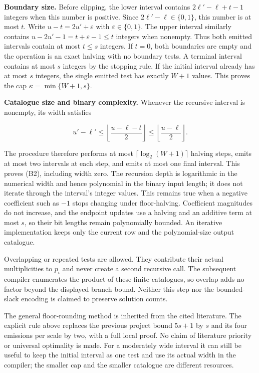 \textbf{Boundary size.} Before clipping, the lower interval contains \(2\ell'-\ell+t-1\) integers when this number is positive. Since \(2\ell'-\ell\in\{0,1\}\), this number is at most \(t\). Write \(u-t=2u'+\varepsilon\) with \(\varepsilon\in\{0,1\}\). The upper interval similarly contains \(u-2u'-1=t+\varepsilon-1\le t\) integers when nonempty. Thus both emitted intervals contain at most \(t\le s\) integers. If \(t=0\), both boundaries are empty and the operation is an exact halving with no boundary tests. A terminal interval contains at most \(s\) integers by the stopping rule. If the initial interval already has at most \(s\) integers, the single emitted test has exactly \(W+1\) values. This proves the cap \(\kappa=\min\{W+1,s\}\).

\textbf{Catalogue size and binary complexity.} Whenever the recursive interval is nonempty, its width satisfies

\[
u'-\ell'\le\left\lfloor\frac{u-\ell-t}{2}\right\rfloor
\le\left\lfloor\frac{u-\ell}{2}\right\rfloor.
\]

The procedure therefore performs at most \(\lceil\log_2(W+1)\rceil\) halving steps, emits at most two intervals at each step, and emits at most one final interval. This proves (B2), including width zero. The recursion depth is logarithmic in the numerical width and hence polynomial in the binary input length; it does not iterate through the interval's integer values. This remains true when a negative coefficient such as \(-1\) stops changing under floor-halving. Coefficient magnitudes do not increase, and the endpoint updates use a halving and an additive term at most \(s\), so their bit lengths remain polynomially bounded. An iterative implementation keeps only the current row and the polynomial-size output catalogue.

Overlapping or repeated tests are allowed. They contribute their actual multiplicities to \(p_i\) and never create a second recursive call. The subsequent compiler enumerates the product of these finite catalogues, so overlap adds no factor beyond the displayed branch bound. Neither this step nor the bounded-slack encoding is claimed to preserve solution counts.

The general floor-rounding method is inherited from the cited literature. The explicit rule above replaces the previous project bound \(5s+1\) by \(s\) and its four emissions per scale by two, with a full local proof. No claim of literature priority or universal optimality is made. For a moderately wide interval it can still be useful to keep the initial interval as one test and use its actual width in the compiler; the smaller cap and the smaller catalogue are different resources.

